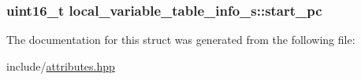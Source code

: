 \hypertarget{structlocal__variable__table__info__s_a1acd5397525801c3fd91411f647e899c}{
\subsubsection[{start\+\_\+pc}]{\setlength{\rightskip}{0pt plus 5cm}uint16\+\_\+t local\+\_\+variable\+\_\+table\+\_\+info\+\_\+s\+::start\+\_\+pc}}\label{structlocal__variable__table__info__s_a1acd5397525801c3fd91411f647e899c}


The documentation for this struct was generated from the following file\+:\begin{DoxyCompactItemize}
\item 
include/\hyperlink{attributes_8hpp}{attributes.\+hpp}\end{DoxyCompactItemize}
